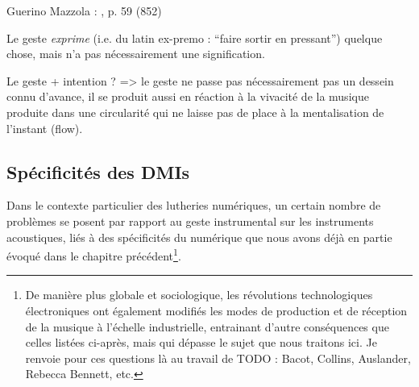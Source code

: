 




Guerino Mazzola :  \cite{mazzola_topos_2018}, p. 59 (852)

Le geste \textit{exprime} (i.e. du latin ex-premo : ``faire sortir en pressant'') quelque chose, mais n'a pas nécessairement une signification.


Le geste + intention ? => le geste ne passe pas nécessairement pas un dessein connu d'avance, il se produit aussi en réaction à la vivacité de la musique produite dans une circularité qui ne laisse pas de place à la mentalisation de l'instant (flow).

\subsection{Spécificités des DMIs}

\noindent Dans le contexte particulier des lutheries numériques, un certain nombre de problèmes se posent par rapport au geste instrumental sur les instruments acoustiques, liés à des spécificités du numérique que nous avons déjà en partie évoqué dans le chapitre précédent\footnote{De manière plus globale et sociologique, les révolutions technologiques électroniques ont également modifiés les modes de production et de réception de la musique à l'échelle industrielle, entrainant d'autre conséquences que celles listées ci-après, mais qui dépasse le sujet que nous traitons ici. Je renvoie pour ces questions là au travail de TODO : Bacot, Collins, Auslander, Rebecca Bennett, etc.}.

